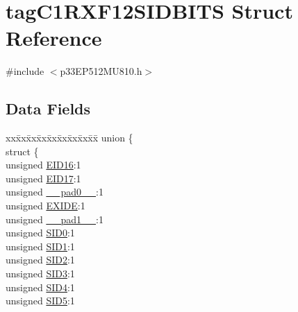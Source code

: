 \hypertarget{structtag_c1_r_x_f12_s_i_d_b_i_t_s}{}\section{tag\+C1\+R\+X\+F12\+S\+I\+D\+B\+I\+TS Struct Reference}
\label{structtag_c1_r_x_f12_s_i_d_b_i_t_s}


{\ttfamily \#include $<$p33\+E\+P512\+M\+U810.\+h$>$}

\subsection*{Data Fields}
\begin{DoxyCompactItemize}
\item 
\begin{tabbing}
xx\=xx\=xx\=xx\=xx\=xx\=xx\=xx\=xx\=\kill
union \{\\
\>struct \{\\
\>\>unsigned \hyperlink{structtag_c1_r_x_f12_s_i_d_b_i_t_s_a6dd5663b0c9838c56db040560ca0efa1}{EID16}:1\\
\>\>unsigned \hyperlink{structtag_c1_r_x_f12_s_i_d_b_i_t_s_aa648615464b0eb29967529333eee9fd9}{EID17}:1\\
\>\>unsigned \hyperlink{structtag_c1_r_x_f12_s_i_d_b_i_t_s_adf71f3d8410c1f1dbbc96680a92c49af}{\_\_pad0\_\_}:1\\
\>\>unsigned \hyperlink{structtag_c1_r_x_f12_s_i_d_b_i_t_s_a09ff1c1be3927220bd3dfbc10edfe243}{EXIDE}:1\\
\>\>unsigned \hyperlink{structtag_c1_r_x_f12_s_i_d_b_i_t_s_acaf2d0924a107ec6e8d2e31febaf66f9}{\_\_pad1\_\_}:1\\
\>\>unsigned \hyperlink{structtag_c1_r_x_f12_s_i_d_b_i_t_s_a1ca276ac15df60e1f7b9a6d0011ade93}{SID0}:1\\
\>\>unsigned \hyperlink{structtag_c1_r_x_f12_s_i_d_b_i_t_s_a3405d354f81391f879648f69f504dfc8}{SID1}:1\\
\>\>unsigned \hyperlink{structtag_c1_r_x_f12_s_i_d_b_i_t_s_ad744966dfc49307f731b7045b01b94e5}{SID2}:1\\
\>\>unsigned \hyperlink{structtag_c1_r_x_f12_s_i_d_b_i_t_s_a9345f3e64720be93e83d8dfc827f3f45}{SID3}:1\\
\>\>unsigned \hyperlink{structtag_c1_r_x_f12_s_i_d_b_i_t_s_aefb106fed4bb40e2c3c71ac612c554e3}{SID4}:1\\
\>\>unsigned \hyperlink{structtag_c1_r_x_f12_s_i_d_b_i_t_s_a0f221b3c9612231686bf87ccdcec8489}{SID5}:1\\

\end{tabbing}
\end{DoxyCompactItemize}
